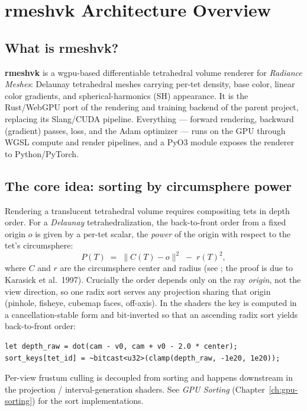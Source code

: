 \chapter{rmeshvk Architecture Overview}\label{ch:overview}

\section{What is rmeshvk?}

\textbf{rmeshvk} is a wgpu-based differentiable tetrahedral volume renderer
for \emph{Radiance Meshes}: Delaunay tetrahedral meshes carrying per-tet
density, base color, linear color gradients, and spherical-harmonics (SH)
appearance. It is the Rust/WebGPU port of the rendering and training backend
of the parent  project, replacing its Slang/CUDA
pipeline. Everything --- forward rendering, backward (gradient) passes, loss,
and the Adam optimizer --- runs on the GPU through WGSL compute and render
pipelines, and a PyO3 module exposes the renderer to Python/PyTorch.

\section{The core idea: sorting by circumsphere power}

Rendering a translucent tetrahedral volume requires compositing tets in depth
order. For a \emph{Delaunay} tetrahedralization, the back-to-front order from
a fixed origin $o$ is given by a per-tet scalar, the \emph{power} of the
origin with respect to the tet's circumsphere:
\[
  P(T) \;=\; \lVert C(T) - o \rVert^2 \;-\; r(T)^2 ,
\]
where $C$ and $r$ are the circumsphere center and radius
(see ; the proof is due to Karasick et al.\ 1997).
Crucially the order depends only on the ray \emph{origin}, not the view
direction, so one radix sort serves any projection sharing that origin
(pinhole, fisheye, cubemap faces, off-axis). In the shaders the key is
computed in a cancellation-stable form and bit-inverted so that an ascending
radix sort yields back-to-front order:

\begin{lstlisting}
let depth_raw = dot(cam - v0, cam + v0 - 2.0 * center);
sort_keys[tet_id] = ~bitcast<u32>(clamp(depth_raw, -1e20, 1e20));
\end{lstlisting}

Per-view frustum culling is decoupled from sorting and happens downstream in
the projection / interval-generation shaders. See
\emph{GPU Sorting} (Chapter~\ref{ch:gpu-sorting}) for the sort implementations.

